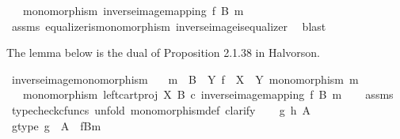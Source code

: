 \begin{isabellebody}
\ \ \ {\isachardoublequoteopen}monomorphism\ {\isacharparenleft}{\kern0pt}inverse{\isacharunderscore}{\kern0pt}image{\isacharunderscore}{\kern0pt}mapping\ f\ B\ m{\isacharparenright}{\kern0pt}{\isachardoublequoteclose}\isanewline
%
\isadelimproof
\ \ %
\endisadelimproof
%
\isatagproof
{}\isamarkupfalse%
\ assms\ equalizer{\isacharunderscore}{\kern0pt}is{\isacharunderscore}{\kern0pt}monomorphism\ inverse{\isacharunderscore}{\kern0pt}image{\isacharunderscore}{\kern0pt}is{\isacharunderscore}{\kern0pt}equalizer{}\ \isamarkupfalse%
\ blast%
\endisatagproof
{\isafoldproof}%
%
\isadelimproof
%
\endisadelimproof
%
\begin{isamarkuptext}%
The lemma below is the dual of Proposition 2.1.38 in Halvorson.%
\end{isamarkuptext}\isamarkuptrue%
\isamarkupfalse%
\ inverse{\isacharunderscore}{\kern0pt}image{\isacharunderscore}{\kern0pt}monomorphism{\isacharcolon}{\kern0pt}\isanewline
\ \ \ {\isachardoublequoteopen}m\ {\isacharcolon}{\kern0pt}\ B\ {\isasymrightarrow}\ Y{\isachardoublequoteclose}\ {\isachardoublequoteopen}f\ {\isacharcolon}{\kern0pt}\ X\ {\isasymrightarrow}\ Y{\isachardoublequoteclose}\ {\isachardoublequoteopen}monomorphism\ m{\isachardoublequoteclose}\isanewline
\ \ \ {\isachardoublequoteopen}monomorphism\ {\isacharparenleft}{\kern0pt}left{\isacharunderscore}{\kern0pt}cart{\isacharunderscore}{\kern0pt}proj\ X\ B\ {\isasymcirc}\isactrlsub c\ inverse{\isacharunderscore}{\kern0pt}image{\isacharunderscore}{\kern0pt}mapping\ f\ B\ m{\isacharparenright}{\kern0pt}{\isachardoublequoteclose}\isanewline
%
\isadelimproof
\ \ %
\endisadelimproof
%
\isatagproof
{}\isamarkupfalse%
\ assms\isanewline
{}\isamarkupfalse%
\ {\isacharparenleft}{\kern0pt}typecheck{\isacharunderscore}{\kern0pt}cfuncs{\isacharcomma}{\kern0pt}\ unfold\ monomorphism{\isacharunderscore}{\kern0pt}def{}{\isacharcomma}{\kern0pt}\ clarify{\isacharparenright}{\kern0pt}\isanewline
\ \ \isamarkupfalse%
\ g\ h\ A\isanewline
\ \ \isamarkupfalse%
\ g{\isacharunderscore}{\kern0pt}type{\isacharcolon}{\kern0pt}\ {\isachardoublequoteopen}g\ {\isacharcolon}{\kern0pt}\ A\ {\isasymrightarrow}\ {\isacharparenleft}{\kern0pt}f\isactrlsup {\isacharminus}{\kern0pt}B{\isasymrparr}\isactrlbsub m\isactrlesub {\isacharparenright}{\kern0pt}{\isachardoublequoteclose}\isanewline
\ \ \isamarkupfalse%

\end{isabellebody}
